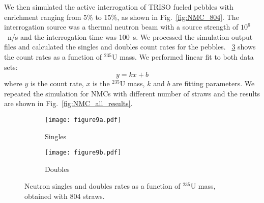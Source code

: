 \documentclass[preprint,final]{elsarticle}
\begin{document}
We then simulated the active interrogation of TRISO fueled pebbles with enrichment ranging from 5\% to 15\%, as shown in Fig.~\ref{fig:NMC_804}. The interrogation source was a thermal neutron beam with a source strength of $10^6$~n/s and the interrogation time was \SI{100}{\s}. We processed the simulation output files and calculated the singles and doubles count rates for the pebbles. ~\ref{fig:NMC_804_results} shows the  count rates as a function of ${}^{235}$U mass. We performed linear fit to both data sets:
\begin{equation}
    y = k x + b\label{eq:linear_fit}
\end{equation}
where $y$ is the  count rate, $x$ is the ${}^{235}$U mass, $k$ and $b$ are fitting parameters. We repeated the simulation for NMCs with different number of straws and the results are shown in Fig.~\ref{fig:NMC_all_results}.
\begin{figure}[!htbp]
    \captionsetup{font=footnotesize}
    \begin{subfigure}[t]{0.5\linewidth}
        \centering
        \texttt{[image: figure9a.pdf]}
        \caption{Singles}
        \label{fig:NMC_804_single}
    \end{subfigure}\hfil
    \begin{subfigure}[t]{0.5\linewidth}
        \centering
        \texttt{[image: figure9b.pdf]}
        \caption{Doubles}
        \label{fig:NMC_804_double}
    \end{subfigure}
    \caption{Neutron singles and doubles rates as a function of ${}^{235}$U mass, obtained with 804 straws.}
    \label{fig:NMC_804_results}
\end{figure}
\end{document}
